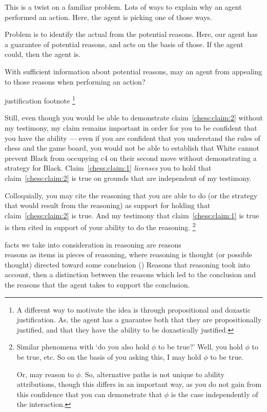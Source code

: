 \documentclass[10pt]{article}
\begin{document}
\begin{note}
  This is a twist on a familiar problem.
  Lots of ways to explain why an agent performed an action.
  Here, the agent is picking one of those ways.

  Problem is to identify the actual from the potential reasons.
  Here, our agent has a guarantee of potential reasons, and acts on the basis of those.
  If the agent could, then the agent is.

  With sufficient information about potential reasons, may an agent from appealing to those reasons when performing an action?

  justification footnote\nolinebreak
  \footnote{
    A different way to motivate the idea is through propositional and doxastic justification.
    As, the agent has a guarantee both that they are propositionally justified, and that they have the ability to be doxastically justified.
  }
\end{note}

Still, even though you would be able to demonstrate claim~\ref{chess:claim:2} without my testimony, my claim remains important in order for you to be confident that you have the ability --- even if you are confident that you understand the rules of chess and the game board, you would not be able to establish that White cannot prevent Black from occupying c4 on their second move without demonstrating a strategy for Black.
Claim~\ref{chess:claim:1} \emph{licenses} you to hold that claim~\ref{chess:claim:2} is true on grounds that are independent of my testimony.

Colloquially, you may cite the reasoning that you are able to do (or the strategy that would result from the reasoning) as support for holding that claim~\ref{chess:claim:2} is true.
And my testimony that claim~\ref{chess:claim:1} is true is then cited in support of your ability to do the reasoning.\nolinebreak
\footnote{
  Similar phenomena with `do you also hold \(\phi\) to be true?'
  Well, you hold \(\phi\) to be true, etc.
  So on the basis of you asking this, I may hold \(\phi\) to be true.

  Or, may reason to \(\phi\).
  So, alternative paths is not unique to ability attributions, though this differs in an important way, as you do not gain from this confidence that you can demonstrate that \(\phi\) is the case independently of the interaction.
}

{
  \color{red}
  facts we take into consideration in reasoning are reasons \\
  reasons as items in pieces of reasoning, where reasoning is thought (or possible thought) directed toward some conclusion (\citeyear[421]{Hieronymi:2011aa})
}
Reasons that reasoning took into account, then a distinction between the reasons which led to the conclusion and the reasons that the agent takes to support the conclusion.
\end{document}
